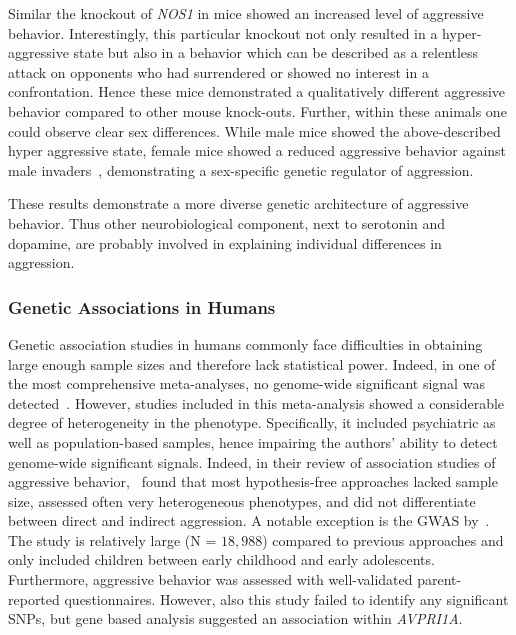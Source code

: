 Similar the knockout of \textit{NOS1} in mice showed an increased level of aggressive behavior.
Interestingly, this particular knockout not only resulted in a hyper-aggressive state but also in a behavior which can be described as a relentless attack on opponents who had surrendered or showed no interest in a confrontation.
Hence these mice demonstrated a qualitatively different aggressive behavior compared to other mouse knock-outs.
Further, within these animals one could observe clear sex differences.
While male mice showed the above-described hyper aggressive state, female mice showed a reduced aggressive behavior against male invaders~\cite{Gammie1999,Nelson1995}, demonstrating a sex-specific genetic regulator of aggression.

These results demonstrate a more diverse genetic architecture of aggressive behavior.
Thus other neurobiological component, next to serotonin and dopamine, are probably involved in explaining individual differences in aggression.

\subsubsection{Genetic Associations in Humans}
\label{ssub:genetic_associations_in_humans}

Genetic association studies in humans commonly face difficulties in obtaining large enough sample sizes and therefore lack statistical power.
Indeed, in one of the most comprehensive meta-analyses, no genome-wide significant signal was detected~\citet{Vassos2014}.
However, studies included in this meta-analysis showed a considerable degree of heterogeneity in the phenotype.
Specifically, it included psychiatric as well as population-based samples, hence impairing the authors' ability to detect genome-wide significant signals.
Indeed, in their review of association studies of aggressive behavior,~\citet{Fernandez-Castillo2016} found that most hypothesis-free approaches lacked sample size, assessed often very heterogeneous phenotypes, and did not differentiate between direct and indirect aggression. 
A notable exception is the GWAS by~\citet{Pappa2016a}.
The study is relatively large (N = $18,988$) compared to previous approaches and only included children between early childhood and early adolescents.
Furthermore, aggressive behavior was assessed with well-validated parent-reported questionnaires. 
However, also this study failed to identify any significant SNPs, but gene based analysis suggested an association within \textit{AVPRI1A}.

